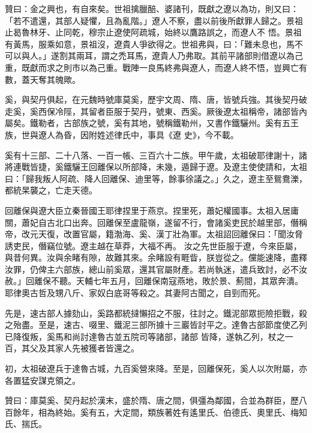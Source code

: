 \begin{pinyinscope}
 贊曰：金之興也，有自來矣。世祖擒臘醅、婆諸刊，既獻之遼以為功，則又曰：「若不遣還，其部人疑懼，且為亂階。」遼人不察，盡以前後所獻罪人歸之。景祖止曷魯林牙、止同乾，穆宗止遼使阿疏城，始終以鷹路誤之，而遼人不
 悟。景祖有黃馬，服乘如意，景祖沒，遼貴人爭欲得之。世祖弗與，曰：「難未息也，馬不可以與人。」遂割其兩耳，謂之禿耳馬，遼貴人乃弗取。其前平諸部則借遼以為己重，既獻而求之則市以為己重。戰陣一良馬終弗與遼人，而遼人終不悟，豈興亡有數，蓋天奪其魄歟。



 奚，與契丹俱起，在元魏時號庫莫奚，歷宇文周、隋、唐，皆號兵強。其後契丹破走奚，奚西保冷陘，其留者臣服于契丹，號東、西奚。厥後遼太祖稱帝，諸部皆內屬矣。鐵勒者，古部族之號，奚有其地，號稱鐵勒州，又書作鐵驪州。奚有五王族，世與遼人為昏，因附姓述律氏中，事具《遼
 史》，今不載。



 奚有十三部、二十八落、一百一帳、三百六十二族。甲午歲，太祖破耶律謝十，諸將連戰皆捷，奚鐵驪王回離保以所部降，未幾，遁歸于遼。及遼主使使請和，太祖曰：「歸我叛人阿疏、降人回離保、迪里等，餘事徐議之。」久之，遼主至鴛鴦濼，都統杲襲之，亡走天德。



 回離保與遼大臣立秦晉國王耶律捏里于燕京。捏里死，蕭妃權國事。太祖入居庸關，蕭妃自古北口出奔。回離保至盧龍嶺，遂留不行，會諸奚吏民於越里部，僭稱帝，改元天復，改置官屬，籍渤海、奚、漢丁壯為軍。太祖詔回離保曰：「聞汝脅誘吏民，僭竊位號。遼主越在草莽，大福不再。
 汝之先世臣服于遼，今來臣屬，與昔何異。汝與余睹有隙，故難其來。余睹設有睚眥，朕豈從之。儻能速降，盡釋汝罪，仍俾主六部族，總山前奚眾，還其官屬財產。若尚執迷，遣兵致討，必不汝赦。」回離保不聽。天輔七年五月，回離保南寇燕地，敗於景、薊間，其眾奔潰。耶律奧古哲及甥八斤、家奴白底哥等殺之。其妻阿古聞之，自剄而死。



 先是，速古部人據劾山，奚路都統撻懶招之不服，往討之。鐵泥部眾扼險拒戰，殺之殆盡。至是，速古、啜里、鐵泥三部所據十三巖皆討平之。達魯古部節度使乙列已降復叛，奚馬和尚討達魯古並五院司等諸部，諸部
 皆降，遂執乙列，杖之一百，其父及其家人先被獲者皆還之。



 初，太祖破遼兵于達魯古城，九百奚營來降。至是，回離保死，奚人以次附屬，亦各置猛安謀克領之。



 贊曰：庫莫奚、契丹起於漢末，盛於隋、唐之間，俱彊為鄰國，合並為群臣，歷八百餘年，相為終始。奚有五，大定間，類族著姓有遙里氏、伯德氏、奧里氏、梅知氏、揣氏。



\end{pinyinscope}